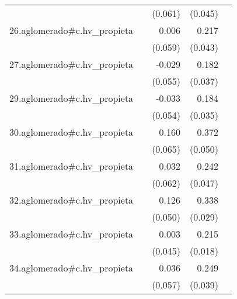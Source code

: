 {\begin{longtable}{l*{4}{D{.}{.}{-1}}}
            &                     &     (0.061)         &     (0.045)         &                     \\
\addlinespace
26.aglomerado#c.hv\_propieta&                     &       0.006         &       0.217\sym{***}&                     \\
            &                     &     (0.059)         &     (0.043)         &                     \\
\addlinespace
27.aglomerado#c.hv\_propieta&                     &      -0.029         &       0.182\sym{***}&                     \\
            &                     &     (0.055)         &     (0.037)         &                     \\
\addlinespace
29.aglomerado#c.hv\_propieta&                     &      -0.033         &       0.184\sym{***}&                     \\
            &                     &     (0.054)         &     (0.035)         &                     \\
\addlinespace
30.aglomerado#c.hv\_propieta&                     &       0.160\sym{*}  &       0.372\sym{***}&                     \\
            &                     &     (0.065)         &     (0.050)         &                     \\
\addlinespace
31.aglomerado#c.hv\_propieta&                     &       0.032         &       0.242\sym{***}&                     \\
            &                     &     (0.062)         &     (0.047)         &                     \\
\addlinespace
32.aglomerado#c.hv\_propieta&                     &       0.126\sym{*}  &       0.338\sym{***}&                     \\
            &                     &     (0.050)         &     (0.029)         &                     \\
\addlinespace
33.aglomerado#c.hv\_propieta&                     &       0.003         &       0.215\sym{***}&                     \\
            &                     &     (0.045)         &     (0.018)         &                     \\
\addlinespace
34.aglomerado#c.hv\_propieta&                     &       0.036         &       0.249\sym{***}&                     \\
            &                     &     (0.057)         &     (0.039)         &                     \\

\end{longtable}}
